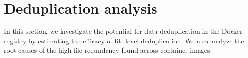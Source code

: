 \section{Deduplication analysis}
\label{sec:redundant_files}

In this section, we investigate the potential for data deduplication in the
Docker registry by estimating the efficacy of file-level
deduplication. 
%
We also analyze the root causes of the high file redundancy found
across container images.
%
%
%
%
%
%
%
%




